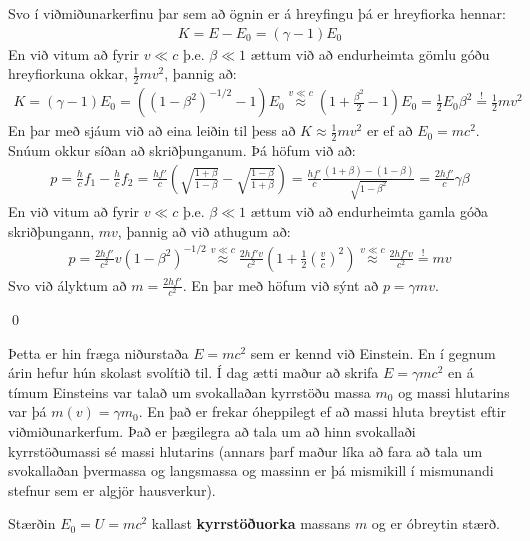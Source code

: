 Svo í viðmiðunarkerfinu þar sem að ögnin er á hreyfingu þá er hreyfiorka hennar:
\begin{align*}
    K = E - E_0 = \left( \gamma -1 \right) E_0
\end{align*}
En við vitum að fyrir $v \ll c$ þ.e. $\beta \ll 1$ ættum við að endurheimta gömlu góðu hreyfiorkuna okkar, $\frac{1}{2}mv^2$, þannig að:
\begin{align*}
    K = \left( \gamma -1 \right)E_0 = \left( \left( 1 - \beta^2 \right)^{-1/2} - 1 \right) E_0 \stackrel{v \ll c}{\approx} \left(1 + \frac{\beta^2}{2} - 1 \right)E_0 = \frac{1}{2}E_0 \beta^2 \stackrel{!}{=} \frac{1}{2}mv^2
\end{align*}
En þar með sjáum við að eina leiðin til þess að $K \approx \frac{1}{2}mv^2$ er ef að $E_0 = mc^2$. Snúum okkur síðan að skriðþunganum. Þá höfum við að:
\begin{align*}
    p = \frac{h}{c} f_1 - \frac{h}{c} f_2 = \frac{hf'}{c} \left( \sqrt{\frac{1+\beta}{1-\beta}} - \sqrt{\frac{1-\beta}{1+\beta}}  \right) = \frac{hf'}{c} \frac{(1+ \beta) - (1-\beta)}{\sqrt{1-\beta^2}} = \frac{2hf'}{c} \gamma \beta
\end{align*}
En við vitum að fyrir $v \ll c$ þ.e. $\beta \ll 1$ ættum við að endurheimta gamla góða skriðþungann, $mv$, þannig að við athugum að:
\begin{align*}
    p = \frac{2hf'}{c^2}v \left(1 - \beta^2 \right)^{-1/2} \stackrel{v \ll c}{\approx} \frac{2hf' v}{c^2} \left(1 + \frac{1}{2}\left( \frac{v}{c} \right)^2 \right) \stackrel{v \ll c}{\approx} \frac{2hf' v}{c^2} \stackrel{!}{=} mv
\end{align*}
Svo við ályktum að $m = \frac{2hf'}{c^2}$. En þar með höfum við sýnt að $p = \gamma mv$.

\qed

Þetta er hin fræga niðurstaða $E = mc^2$ sem er kennd við Einstein. En í gegnum árin hefur hún skolast svolítið til. Í dag ætti maður að skrifa $E = \gamma mc^2$ en á tímum Einsteins var talað um svokallaðan kyrrstöðu massa $m_0$ og massi hlutarins var þá $m(v) = \gamma m_0$. En það er frekar óheppilegt ef að massi hluta breytist eftir viðmiðunarkerfum. Það er þægilegra að tala um að hinn svokallaði kyrrstöðumassi sé massi hlutarins (annars þarf maður líka að fara að tala um svokallaðan þvermassa og langsmassa og massinn er þá mismikill í mismunandi stefnur sem er algjör hausverkur).


\begin{tcolorbox}
\begin{definition}
Stærðin $E_0 = U = mc^2$ kallast \textbf{kyrrstöðuorka} massans $m$ og er óbreytin stærð.
\end{definition}
\end{tcolorbox}

